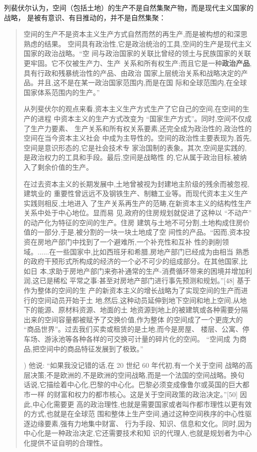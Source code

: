 列裴伏尔认为，空间（包括土地）的生产不是自然集聚产物，而是现代主义国家的战略，
是被有意识、有目推动的，并不是自然集聚：
\begin{quotation}
  空间的生产不是资本主义生产方式自然而然的再生产,而是被构想的和深思熟虑的结果。
  空间具有政治性,它是政治统治的工具,空间的生产是现代主义国家的政治战略。“空
  间与政治国家的关联比曾经的领土与民族国家的关联更牢固。它不仅被生产力、生产
  关系和所有权生产;而且它是一种\textbf{政治产品},具有行政和残暴统治性的产品、由政治
  国家上层统治关系和战略决定的产品。并且,这不是在某一政治国家范围内,而是在国
  际和全球范围内,在全球国家体系范围内的生产。”

  从列斐伏尔的观点来看,资本主义生产方式生产了它自己的空间,在空间的生产的进程
  中资本主义的生产方式改变为 “国家生产方式”。同时,空间不仅成了生产力要素、
  生产关系和所有权关系要素,还完全成为政治性的,政治性的空间在当今资本主义社会
  中成为主导性的。空间的政治性主要表现为,首先,空间是意识形态的,它是社会技术专
  家治国制的表象。其次,空间是实践的,是政治权力的工具和手段。最后,空间是战略性
  的,它从属于政治目标,被纳入了剩余价值的生产。

  在过去资本主义的长期发展中,土地曾被视为封建地主阶级的残余而被忽视,建筑业的
  重要性曾远远不及钢铁生产、制糖工业等。而现代资本主义生产实践则相反,土地进入
  了生产关系再生产的范畴,在新资本主义的结构性生产关系中处于中心地位。显而易
  见,政府的住房规划就促进了这种以 “不动产” 的动产化为特征的空间的生产。住房
  建筑与土地不可分割,土地构成住房价值的一部分,于是,被分割的一块一块土地成了空
  间性的产品。“因而,资本投资在房地产部门中找到了一个避难所,一个补充性和互补
  性的剥削领域。......在一些国家中,比如西班牙和希腊,房地产部门已经成为由相当
  熟悉的政府干预形式所构成的经济的一个必不可少的组成部分。在其他国家,比如日
  本,求助于房地产部门来弥补通常的生产-消费循环带来的困境并增加利润,这已是稀松
  平常之事:甚至对房地产部门进行事先预测和规划。”[48] 基于作为整体的空间的生
  产的新资本主义的增长战略为了实现空间的生产而进行的空间动员开始于土
  地,然后,这种动员延伸到地下空间和地上空间,从地下的能源、原材料资源、地面的土
  地资源到地上的被建筑或各种需要分隔出来的空间容量都被赋予了交换价值,作为整体
  的空间成了一个更庞大的 “商品世界”。过去我们买卖或租赁的是土地,而今是房屋、
  楼层、公寓、停车场、游泳池等各种各样的可交换可计量的碎片化的空间。 “空间成
  为商品,把空间中的商品特征发展到了极致。”

)
他说: “如果我没记错的话,在 20 世纪 60 年代初,有一个关于空间
战略的高层决策;不是欧洲的,不是欧洲的空间战略,而是一个法国的空间战略。换句
话说,它描绘着中心化,巴黎的中心化。巴黎必须变成像鲁尔或英国的巨大都市一样
的财富和权力的都市核心。这是关于空间政策的政治决定。”[50] 因此,中心化需要更
高的政治理性,也就是需要国家或者叫作都市理性以更有效的方式,也就是在全球范
围和整体上生产空间,通过这种空间秩序的中心性驱逐边缘要素,强有力地集中财富、
行为手段、知识、信息和文化。同时,因为中心化是一种政治决定,它还需要技术和知
识的代理人,也就是规划者为中心化提供不证自明的合理性。


\end{quotation}
